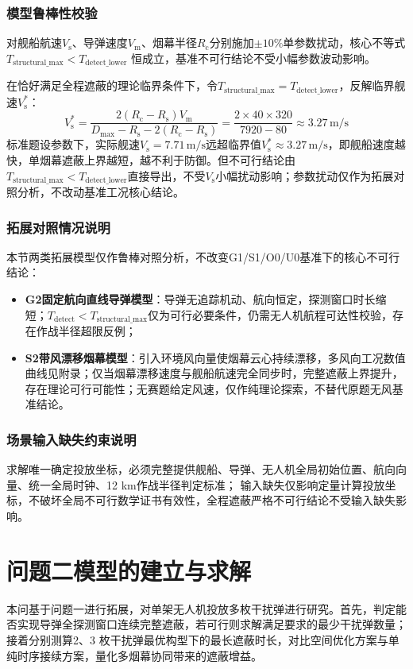 \documentclass[withoutpreface,bwprint]{cumcmthesis}
\renewcommand{\textbf}[1]{{\song\bfseries #1}}
\begin{document}
\subsubsection{模型鲁棒性校验}

对舰船航速$V_{\mathrm{s}}$、导弹速度$V_{\mathrm{m}}$、烟幕半径$R_{\mathrm{c}}$分别施加$\pm10\%$单参数扰动，核心不等式 $T_{\text{structural\_max}}<T_{\text{detect\_lower}}$ 恒成立，基准不可行结论不受小幅参数波动影响。

在恰好满足全程遮蔽的理论临界条件下，令$T_{\text{structural\_max}}=T_{\text{detect\_lower}}$，反解临界舰速$V_{\mathrm{s}}^*$：
\[V_{\mathrm{s}}^* = \frac{2(R_{\mathrm{c}}-R_{\mathrm{s}})V_{\mathrm{m}}}{D_{\max}-R_{\mathrm{s}}-2(R_{\mathrm{c}}-R_{\mathrm{s}})} = \frac{2\times40\times320}{7920-80} \approx 3.27\,\text{m/s}\]
标准题设参数下，实际舰速$V_{\mathrm{s}}=7.71\,\text{m/s}$远超临界值$V_{\mathrm{s}}^*\approx3.27\,\text{m/s}$，即舰船速度越快，单烟幕遮蔽上界越短，越不利于防御。但不可行结论由$T_{\text{structural\_max}}<T_{\text{detect\_lower}}$直接导出，不受$V_{\mathrm{s}}$小幅扰动影响；参数扰动仅作为拓展对照分析，不改动基准工况核心结论。


\subsubsection{拓展对照情况说明}
本节两类拓展模型仅作鲁棒对照分析，不改变G1/S1/O0/U0基准下的核心不可行结论：
\begin{itemize}
	\item \textbf{G2固定航向直线导弹模型}：导弹无追踪机动、航向恒定，探测窗口时长缩短；$T_{\text{detect}}<T_{\text{structural\_max}}$仅为可行必要条件，仍需无人机航程可达性校验，存在作战半径超限反例；
	\item \textbf{S2带风漂移烟幕模型}：引入环境风向量使烟幕云心持续漂移，多风向工况数值曲线见附录；仅当烟幕漂移速度与舰船航速完全同步时，完整遮蔽上界提升，存在理论可行可能性；无赛题给定风速，仅作纯理论探索，不替代原题无风基准结论。
\end{itemize}

\subsubsection{场景输入缺失约束说明}
求解唯一确定投放坐标，必须完整提供舰船、导弹、无人机全局初始位置、航向向量、统一全局时钟、12 km作战半径判定标准；
输入缺失仅影响定量计算投放坐标，不破坏全局不可行数学证书有效性，全程遮蔽严格不可行结论不受输入缺失影响。


\section{问题二模型的建立与求解}
本问基于问题一进行拓展，对单架无人机投放多枚干扰弹进行研究。首先，判定能否实现导弹全探测窗口连续完整遮蔽，若可行则求解满足要求的最少干扰弹数量；接着分别测算2、3 枚干扰弹最优构型下的最长遮蔽时长，对比空间优化方案与单纯时序接续方案，量化多烟幕协同带来的遮蔽增益。
\end{document}
